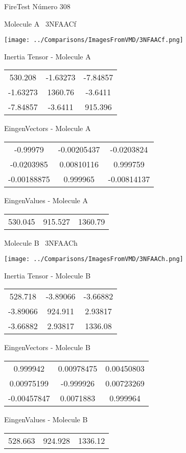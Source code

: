 \vtab[-3cm]
\begin{center}
{\large FireTest \tab Número 308}
\end{center}
\begin{multicols}{2}
\begin{center}

Molecule A \
3NFAACf

\texttt{[image: ../Comparisons/ImagesFromVMD/3NFAACf.png]}

Inertia Tensor - Molecule A \\
\begin{tabular}{|c c c|}
530.208	 & 	-1.63273	 & 	-7.84857	 \\
-1.63273	 & 	1360.76	 & 	-3.6411	 \\
-7.84857	 & 	-3.6411	 & 	915.396
\end{tabular}

\vtab
 EingenVectors - Molecule A     \\
\begin{tabular}{|c c c|}
-0.99979	 & 	-0.00205437	 & 	-0.0203824	 \\
-0.0203985	 & 	0.00810116	 & 	0.999759	 \\
-0.00188875	 & 	0.999965	 & 	-0.00814137
\end{tabular}

\vtab
 EingenValues - Molecule A     \\
\begin{tabular}{|c c c|}
530.045	 & 	915.527	 & 	1360.79	 \\
\end{tabular}
\columnbreak

Molecule B \
3NFAACh

\texttt{[image: ../Comparisons/ImagesFromVMD/3NFAACh.png]}

Inertia Tensor - Molecule B \\
\begin{tabular}{|c c c|}
528.718	 & 	-3.89066	 & 	-3.66882	 \\
-3.89066	 & 	924.911	 & 	2.93817	 \\
-3.66882	 & 	2.93817	 & 	1336.08
\end{tabular}

\vtab
 EingenVectors - Molecule B     \\
\begin{tabular}{|c c c|}
0.999942	 & 	0.00978475	 & 	0.00450803	 \\
0.00975199	 & 	-0.999926	 & 	0.00723269	 \\
-0.00457847	 & 	0.0071883	 & 	0.999964
\end{tabular}

\vtab
 EingenValues - Molecule B     \\
\begin{tabular}{|c c c|}
528.663	 & 	924.928	 & 	1336.12	 \\
\end{tabular}

\end{center}
\end{multicols}

